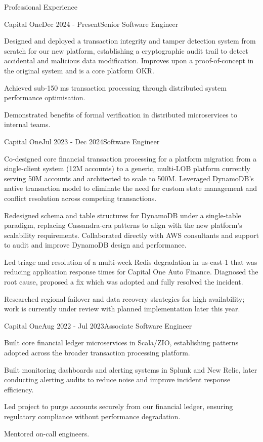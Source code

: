 \documentclass{resume}
\begin{document}
\begin{rSection}{Professional Experience}

\begin{rSubsection}{Capital One}{Dec 2024 - Present}{Senior Software Engineer}{}
\item Designed and deployed a transaction integrity and tamper detection system from scratch for our new platform, establishing a cryptographic audit trail to detect accidental and malicious data modification. Improves upon a proof-of-concept in the original system and is a core platform OKR.
\item Achieved sub‑150 ms transaction processing through distributed system performance optimisation.
\item Demonstrated benefits of formal verification in distributed microservices to internal teams.
\end{rSubsection}

\begin{rSubsection}{Capital One}{Jul 2023 - Dec 2024}{Software Engineer}{}
\item Co-designed core financial transaction processing for a platform migration from a single-client system (12M accounts) to a generic, multi-LOB platform currently serving 50M accounts and architected to scale to 500M. Leveraged DynamoDB's native transaction model to eliminate the need for custom state management and conflict resolution across competing transactions.
\item Redesigned schema and table structures for DynamoDB under a single-table paradigm, replacing Cassandra-era patterns to align with the new platform's scalability requirements. Collaborated directly with AWS consultants and support to audit and improve DynamoDB design and performance.
\item Led triage and resolution of a multi-week Redis degradation in us-east-1 that was reducing application response times for Capital One Auto Finance. Diagnosed the root cause, proposed a fix which was adopted and fully resolved the incident.
\item Researched regional failover and data recovery strategies for high availability; work is currently under review with planned implementation later this year.
\end{rSubsection}

\begin{rSubsection}{Capital One}{Aug 2022 - Jul 2023}{Associate Software Engineer}{}
\item Built core financial ledger microservices in Scala/ZIO, establishing patterns adopted across the broader transaction processing platform.
\item Built monitoring dashboards and alerting systems in Splunk and New Relic, later conducting alerting audits to reduce noise and improve incident response efficiency.
\item Led project to purge accounts securely from our financial ledger, ensuring regulatory compliance without performance degradation.
\item Mentored on-call engineers.
\end{rSubsection}


\end{rSection}
\end{document}
